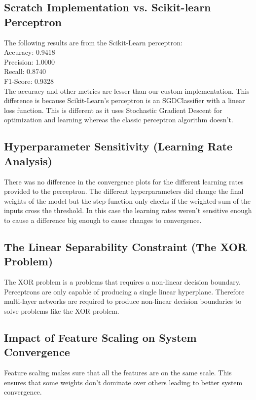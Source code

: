 \documentclass[11pt]{article}
\begin{document}
\subsection*{Scratch Implementation vs. Scikit-learn Perceptron}
The following results are from the Scikit-Learn perceptron: \\
Accuracy:  0.9418 \\
Precision: 1.0000 \\
Recall:    0.8740 \\
F1-Score:  0.9328 \\

The accuracy and other metrics are lesser than our custom implementation. This difference is because Scikit-Learn's perceptron is an SGDClassifier with a linear loss function. This is different as it uses Stochastic Gradient Descent for optimization and learning whereas the classic perceptron algorithm doesn't.

\subsection*{Hyperparameter Sensitivity (Learning Rate Analysis)}
There was no difference in the convergence plots for the different learning rates provided to the perceptron. The different hyperparameters did change the final weights of the model but the step-function only checks if the weighted-sum of the inputs cross the threshold. In this case the learning rates weren't sensitive enough to cause a difference big enough to cause changes to convergence.

\subsection*{The Linear Separability Constraint (The XOR Problem)}
The XOR problem is a problems that requires a non-linear decision boundary. Perceptrons are only capable of producing a single linear hyperplane. Therefore multi-layer networks are required to produce non-linear decision boundaries to solve problems like the XOR problem.

\subsection*{Impact of Feature Scaling on System Convergence}
Feature scaling makes sure that all the features are on the same scale. This ensures that some weights don't dominate over others leading to better system convergence.

\end{document}
